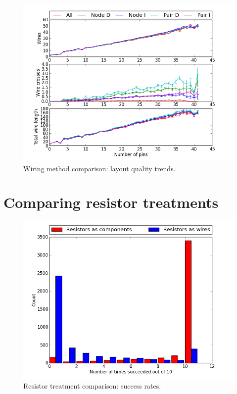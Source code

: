 \begin{figure}
\begin{center}
\includegraphics[width=\textwidth]{Images/wiring_quality_trend_comparison.png}
\caption{Wiring method comparison: layout quality trends.}
\label{fig:wiring_quality_trend}
\end{center}
\end{figure}

\section{Comparing resistor treatments}

\begin{figure}[H]
\begin{center}
\includegraphics[width=\textwidth]{Images/resistor_success_comparison.png}
\caption{Resistor treatment comparison: success rates.}
\label{fig:resistor_success}
\end{center}
\end{figure}

